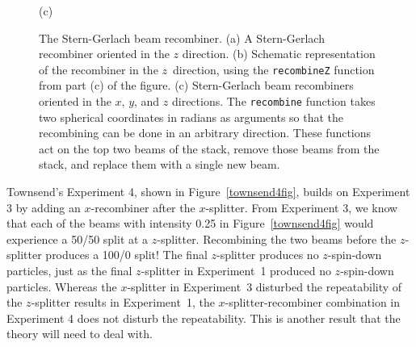 \documentclass{eptcs}
\newcommand{\FunctionTok}[1]{\textcolor[rgb]{0.02,0.16,0.49}{{#1}}}
\begin{document}
\begin{figure}
\begin{center}
(c)
  \end{center}
\caption{The Stern-Gerlach beam recombiner.
  (a) A Stern-Gerlach recombiner oriented in the $z$ direction.
  (b) Schematic representation of the recombiner in the $z$~direction,
   using the \FunctionTok{\texttt{recombineZ}} function from part (c)
   of the figure.
  (c) Stern-Gerlach beam recombiners oriented in the $x$, $y$, and $z$ directions.
  The \FunctionTok{\texttt{recombine}} function takes two spherical coordinates in radians as
  arguments so that the recombining can be done in an arbitrary direction.
  These functions act on the top two beams of the stack, remove those
  beams from the stack, and replace them with a single new beam.
}
\label{sgrecombiner}
\end{figure}

Townsend's Experiment 4, shown in Figure~\ref{townsend4fig},
builds on Experiment 3 by adding an $x$-recombiner after the $x$-splitter.
From Experiment 3, we know that each of the beams with intensity 0.25
in Figure~\ref{townsend4fig} would experience a 50/50 split at a $z$-splitter.
Recombining the two beams before the $z$-splitter produces a 100/0 split!
The final $z$-splitter produces no $z$-spin-down particles, just as the
final $z$-splitter in Experiment~1 produced no $z$-spin-down particles.
Whereas the $x$-splitter in Experiment~3 disturbed the repeatability
of the $z$-splitter results in Experiment~1, the $x$-splitter-recombiner
combination in Experiment 4 does not disturb the repeatability.
This is another result that the theory will need to deal with.
\end{document}
